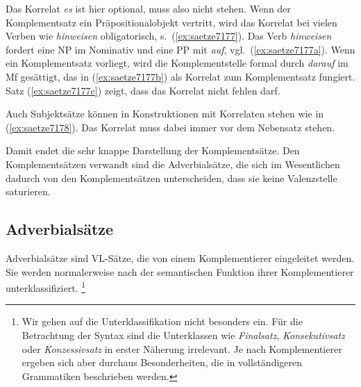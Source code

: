 Das Korrelat \textit{es} ist hier optional, muss also nicht stehen.
Wenn der Komplementsatz ein Präpositionalobjekt vertritt, wird das Korrelat bei vielen Verben wie \textit{hinweisen} obligatorisch, s.\ (\ref{ex:saetze7177}).
Das Verb \textit{hinweisen} fordert eine NP im Nominativ und eine PP mit \textit{auf}, vgl.\ (\ref{ex:saetze7177a}).
Wenn ein Komplementsatz vorliegt, wird die Komplementstelle formal durch \textit{darauf} im Mf gesättigt, das in (\ref{ex:saetze7177b}) als Korrelat zum Komplementsatz fungiert.
Satz (\ref{ex:saetze7177c}) zeigt, dass das Korrelat nicht fehlen darf.

\begin{exe}
  \ex\label{ex:saetze7177}
  \begin{xlist}
  \end{xlist}
\end{exe}

Auch Subjektsätze können in Konstruktionen mit Korrelaten stehen wie in (\ref{ex:saetze7178}).
Das Korrelat muss dabei immer vor dem Nebensatz stehen.

\begin{exe}
  \ex\label{ex:saetze7178}
  \begin{xlist}
  \end{xlist}
\end{exe}

Damit endet die sehr knappe Darstellung der Komplementsätze.
Den Komplementsätzen verwandt sind die Adverbialsätze, die sich im Wesentlichen dadurch von den Komplementsätzen unterscheiden, dass sie keine Valenzstelle saturieren.

\subsection{Adverbialsätze}

\label{sec:adverbialsaetze}

Adverbialsätze sind VL-Sätze, die von einem Komplementierer eingeleitet werden.
Sie werden normalerweise nach der semantischen Funktion ihrer Komplementierer unterklassifiziert.%
\footnote{Wir gehen auf die Unterklassifikation nicht besonders ein.
Für die Betrachtung der Syntax sind die Unterklassen wie \textit{Finalsatz}, \textit{Konsekutivsatz} oder \textit{Konzessivsatz} in erster Näherung irrelevant.
Je nach Komplementierer ergeben sich aber durchaus Besonderheiten, die in vollständigeren Grammatiken beschrieben werden.}

